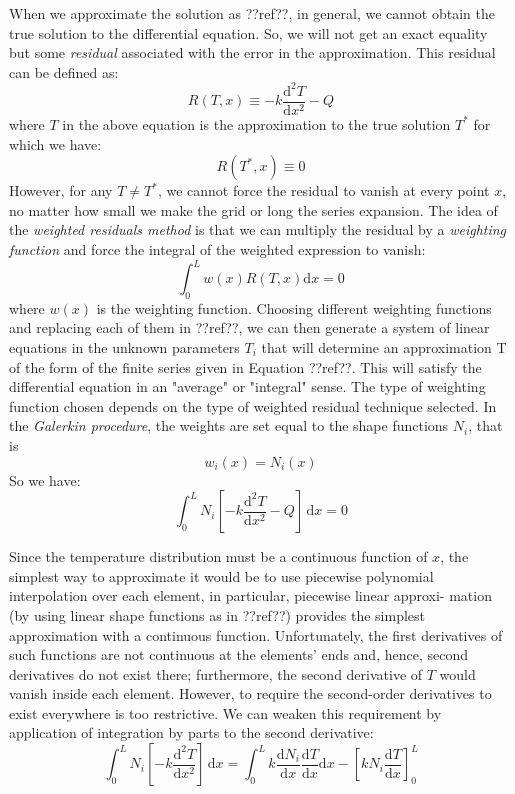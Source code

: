 \documentclass[a4paper,12pt]{article} %
\begin{document}
When we approximate the solution as ??ref??, in general, we cannot obtain the true
solution to the differential equation. So, we will not get an exact equality but
some \textit{residual} associated with the error in the approximation. This residual
can be defined as:
\begin{equation}
R(T,x) \equiv -k \frac{\mathrm{d}^2 T}{\mathrm{d}x^2} - Q
\end{equation}
where $T$ in the above equation is the approximation to the true solution $T^{*}$
for which we have:
\begin{equation}
R(T^{*},x) \equiv 0
\end{equation}
However, for any $T \neq T^{\mathrm{*}}$, we cannot force the residual
to vanish at every
point $x$, no matter how small we make the grid or long the series expansion.
The idea of the \textit{weighted residuals method} is that we can multiply
the residual by a \textit{weighting function} and force the integral of the weighted
expression to vanish:
\begin{equation}
\int_{0}^{L} w(x) R(T,x) \mathrm{d}x = 0
\end{equation}
where $w(x)$ is the weighting function.
Choosing different weighting functions and replacing each of them in
??ref??, we can then generate a system
of linear equations in the unknown parameters $T_{i}$ that will determine an
approximation T of the form of the finite series given in Equation ??ref??.
This will satisfy the differential equation in an "average" or "integral" sense.
The type of weighting function chosen depends on the type of weighted
residual technique selected. In the \textit{Galerkin procedure}, the weights are set
equal to the shape functions $N_{i}$, that is
\begin{equation}
w_{i}(x) = N_{i}(x)
\end{equation}
So we have:
\begin{equation}
\int_{0}^{L} N_{i} \left[
-k\frac{\mathrm{d}^2 T}{\mathrm{d}x^2} - Q
\right]\,\mathrm{d}x = 0
\end{equation}

Since the temperature distribution must be a continuous function of $x$,
the simplest way to approximate it would be to use piecewise polynomial
interpolation over each element, in particular, piecewise linear approxi-
mation (by using linear shape functions as in ??ref??)
provides the simplest approximation with a continuous function.
Unfortunately, the first derivatives of such functions are not continuous
at the elements' ends and, hence, second derivatives do not exist there;
furthermore, the second derivative of $T$ would vanish inside each element.
However, to require the second-order derivatives to exist everywhere is
too restrictive.
We can weaken this requirement by application of integration by parts to
the second derivative:
\begin{equation}
\int_{0}^{L} N_{i} \left[ -k\frac{\mathrm{d}^2 T}{\mathrm{d}x^2} \right]\,\mathrm{d}x =
\int_{0}^{L} k \frac{\mathrm{d} N_{i}}{\mathrm{d}x}
\frac{\mathrm{d} T}{\mathrm{d}x} \mathrm{d}x -
\left[ k N_{i} \frac{\mathrm{d}T}{\mathrm{d}x} \right]_{0}^{L}
\end{equation}
\end{document}
